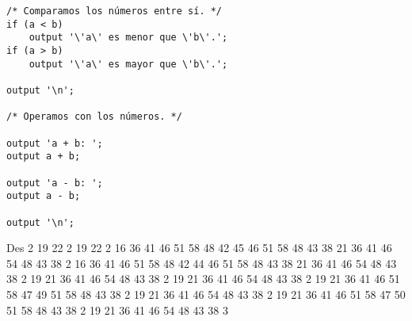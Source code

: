 \begin{enumerate}
\begin{tcolorbox}[title={Código fuente}, colback=white, breakable]
\begin{lstlisting}
/* Comparamos los números entre sí. */
if (a < b)
    output '\'a\' es menor que \'b\'.';
if (a > b)
    output '\'a\' es mayor que \'b\'.';

output '\n';

/* Operamos con los números. */

output 'a + b: ';
output a + b;

output 'a - b: ';
output a - b;

output '\n';
        \end{lstlisting}        
    \end{tcolorbox}

    \begin{tcolorbox}[title={Volcado del fichero de parse}, colback=white, breakable]
Des 2 19 22 2 19 22 2 16 36 41 46 51 58 48 42 45 46 51 58 48 43 38 21 36 41 46 54 48 43 38 2 16 36 41 46 51 58 48 42 44 46 51 58 48 43 38 21 36 41 46 54 48 43 38 2 19 21 36 41 46 54 48 43 38 2 19 21 36 41 46 54 48 43 38 2 19 21 36 41 46 51 58 47 49 51 58 48 43 38 2 19 21 36 41 46 54 48 43 38 2 19 21 36 41 46 51 58 47 50 51 58 48 43 38 2 19 21 36 41 46 54 48 43 38 3
    \end{tcolorbox}


\end{enumerate}
